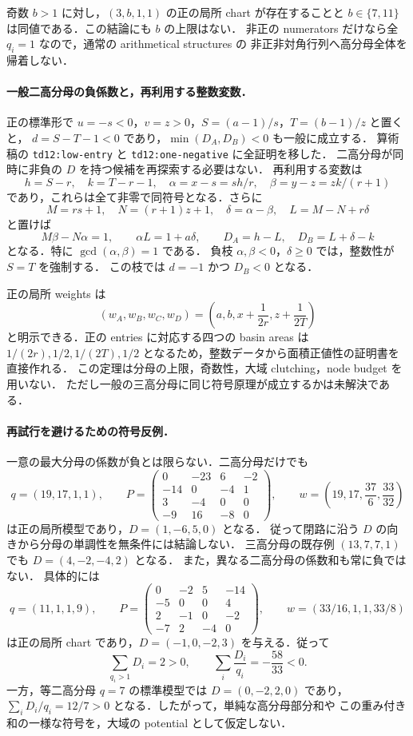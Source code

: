 奇数 $b>1$ に対し，$(3,b,1,1)$ の正の局所 chart が存在することと
$b\in\{7,11\}$ は同値である．この結論にも $b$ の上限はない．
非正の numerators だけなら全 $q_i=1$ なので，通常の arithmetical structures の
非正非対角行列\cite[\S\S1--3]{CorralesValencia}へ高分母全体を帰着しない．

\paragraph{一般二高分母の負係数と，再利用する整数変数．}
正の標準形で $u=-s<0$，$v=z>0$，$S=(a-1)/s$，$T=(b-1)/z$ と置くと，
$d=S-T-1<0$ であり，$\min(D_A,D_B)<0$ も一般に成立する．
算術稿の \texttt{td12:low-entry} と \texttt{td12:one-negative} に全証明を移した．
二高分母が同時に非負の $D$ を持つ候補を再探索する必要はない．
再利用する変数は
\[
 h=S-r,\quad k=T-r-1,\quad
 \alpha=x-s=sh/r,\quad \beta=y-z=zk/(r+1)
\]
であり，これらは全て非零で同符号となる．さらに
\[
 M=rs+1,\quad N=(r+1)z+1,\quad
 \delta=\alpha-\beta,\quad L=M-N+r\delta
\]
と置けば
\[
 M\beta-N\alpha=1,\qquad \alpha L=1+a\delta,
 \qquad D_A=h-L,\quad D_B=L+\delta-k
\]
となる．特に $\gcd(\alpha,\beta)=1$ である．
負枝 $\alpha,\beta<0$，$\delta\geq0$ では，整数性が $S=T$ を強制する．
この枝では $d=-1$ かつ $D_B<0$ となる．

正の局所 weights は
\[
 (w_A,w_B,w_C,w_D)
 =\left(a,b,x+\frac1{2r},z+\frac1{2T}\right)
\]
と明示できる．正の entries に対応する四つの basin areas は
$1/(2r),1/2,1/(2T),1/2$ となるため，整数データから面積正値性の証明書を直接作れる．
この定理は分母の上限，奇数性，大域 clutching，node budget を用いない．
ただし一般の三高分母に同じ符号原理が成立するかは未解決である．

\paragraph{再試行を避けるための符号反例．}
一意の最大分母の係数が負とは限らない．二高分母だけでも
\[
 q=(19,17,1,1),\qquad
 P=\begin{pmatrix}
 0&-23&6&-2\\-14&0&-4&1\\3&-4&0&0\\-9&16&-8&0
 \end{pmatrix},\qquad
 w=\left(19,17,\frac{37}{6},\frac{33}{32}\right)
\]
は正の局所模型であり，$D=(1,-6,5,0)$ となる．
従って閉路に沿う $D$ の向きから分母の単調性を無条件には結論しない．
三高分母の既存例 $(13,7,7,1)$ でも $D=(4,-2,-4,2)$ となる．
また，異なる二高分母の係数和も常に負ではない．
具体的には
\[
 q=(11,1,1,9),\qquad
 P=\begin{pmatrix}
 0&-2&5&-14\\
 -5&0&0&4\\
 2&-1&0&-2\\
 -7&2&-4&0
 \end{pmatrix},\qquad
 w=(33/16,1,1,33/8)
\]
は正の局所 chart であり，$D=(-1,0,-2,3)$ を与える．従って
\[
 \sum_{q_i>1}D_i=2>0,\qquad
 \sum_i\frac{D_i}{q_i}=-\frac{58}{33}<0.
\]
一方，等二高分母 $q=7$ の標準模型では $D=(0,-2,2,0)$ であり，
$\sum_iD_i/q_i=12/7>0$ となる．したがって，単純な高分母部分和や
この重み付き和の一様な符号を，大域の potential として仮定しない．

